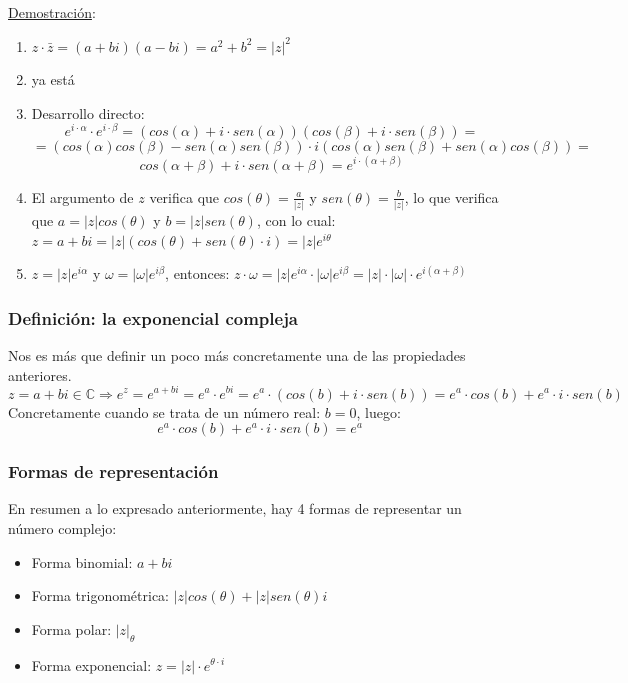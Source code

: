 \documentclass[10pt,a4paper,openright]{book}
\theoremstyle{break}
\begin{document}
\underline{Demostración}:
\begin{enumerate}
\item $z\cdot \bar{z}=(a+bi)(a-bi)=a^2+b^2=|z|^2$
\item ya está
\item Desarrollo directo:
$$e^{i\cdot \alpha}\cdot e^{i\cdot \beta}=\left( cos(\alpha)+i\cdot sen(\alpha)\right) \left( cos(\beta)+ i\cdot sen(\beta)\right)=$$
$$=\left( cos(\alpha)cos(\beta)-sen(\alpha)sen(\beta)\right)\cdot i\left( cos(\alpha)sen(\beta)+sen(\alpha)cos(\beta)\right)=$$
$$cos(\alpha + \beta)+ i\cdot sen(\alpha + \beta)= e^{i\cdot(\alpha + \beta)}$$

\item El argumento de $z$ verifica que $cos(\theta)=\frac{a}{|z|}$ y $sen(\theta)=\frac{b}{|z|}$, lo que verifica que $a=|z|cos(\theta)$ y $b=|z|sen(\theta)$, con lo cual: $z=a+bi=|z|(cos(\theta)+sen(\theta)\cdot i)=|z|e^{i\theta}$

\item $z=|z|e^{i\alpha}$ y $\omega=|\omega|e^{i\beta}$, entonces: $z\cdot \omega=|z|e^{i\alpha}\cdot |\omega|e^{i\beta}=|z|\cdot |\omega|\cdot e^{i(\alpha +\beta)}$
\end{enumerate}

\subsubsection{Definición: la exponencial compleja}
Nos es más que definir un poco más concretamente una de las propiedades anteriores.
$$z=a+bi\in \mathbb C\Rightarrow e^z=e^{a+bi}=e^a\cdot e^{bi}=e^a\cdot (cos(b)+i\cdot sen(b))=e^a\cdot cos(b)+e^a\cdot i\cdot sen(b)$$
Concretamente cuando se trata de un número real: $b=0$, luego:
$$e^a\cdot cos(b)+e^a\cdot i\cdot sen(b)=e^a$$

\subsubsection{Formas de representación}
En resumen a lo expresado anteriormente, hay 4 formas de representar un número complejo:
\begin{itemize}
\item Forma binomial: $a+bi$
\item Forma trigonométrica: $|z|cos(\theta)+ |z|sen(\theta)i$
\item Forma polar: $|z|_\theta$
\item Forma exponencial: $z=|z|\cdot e^{\theta\cdot i}$
\end{itemize}
\end{document}

